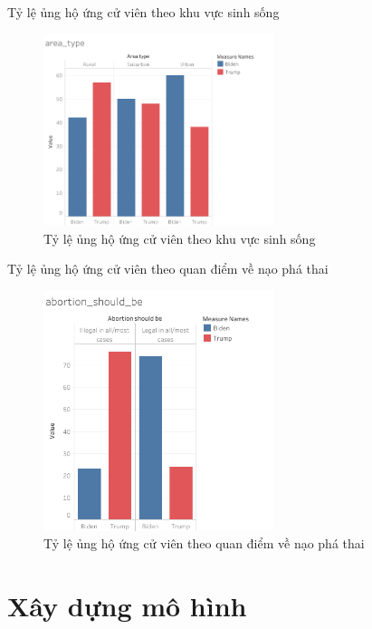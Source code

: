 \documentclass[10pt]{beamer}
\theoremstyle{remark}
\theoremstyle{definition}
\begin{document}
\begin{frame}{Tỷ lệ ủng hộ ứng cử viên theo khu vực sinh sống}
	\begin{figure}[h!]
        \centering
        \includegraphics[width=0.6\textwidth]{figures/area_type.png}
        \caption{Tỷ lệ ủng hộ ứng cử viên theo khu vực sinh sống}
    \end{figure}
\end{frame}

\begin{frame}{Tỷ lệ ủng hộ ứng cử viên theo quan điểm về nạo phá thai}
	\begin{figure}[h!]
        \centering
        \includegraphics[width=0.6\textwidth]{figures/abortion_should_be.png}
        \caption{Tỷ lệ ủng hộ ứng cử viên theo quan điểm về nạo phá thai}
    \end{figure}
\end{frame}

\section{Xây dựng mô hình}
\end{document}
